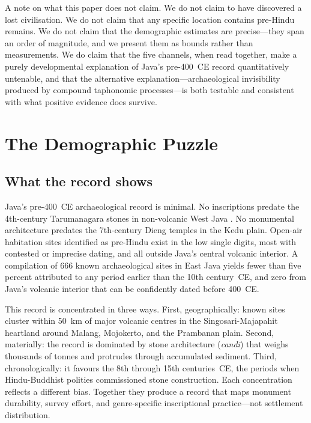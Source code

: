 \documentclass[12pt,a4paper]{article}
\begin{document}
A note on what this paper does not claim. We do not claim to have discovered a lost civilisation. We do not claim that any specific location contains pre-Hindu remains. We do not claim that the demographic estimates are precise---they span an order of magnitude, and we present them as bounds rather than measurements. We do claim that the five channels, when read together, make a purely developmental explanation of Java's pre-400~CE record quantitatively untenable, and that the alternative explanation---archaeological invisibility produced by compound taphonomic processes---is both testable and consistent with what positive evidence does survive.


\section{The Demographic Puzzle}
\label{sec:puzzle}

\subsection{What the record shows}

Java's pre-400~CE archaeological record is minimal. No inscriptions predate the 4th-century Tarumanagara stones in non-volcanic West Java \citep{vogel1918,coedes1968}. No monumental architecture predates the 7th-century Dieng temples in the Kedu plain. Open-air habitation sites identified as pre-Hindu exist in the low single digits, most with contested or imprecise dating, and all outside Java's central volcanic interior. A compilation of 666 known archaeological sites in East Java \citep[P1-core]{amien_p1core} yields fewer than five percent attributed to any period earlier than the 10th century~CE, and zero from Java's volcanic interior that can be confidently dated before 400~CE.

This record is concentrated in three ways. First, geographically: known sites cluster within 50~km of major volcanic centres in the Singosari-Majapahit heartland around Malang, Mojokerto, and the Prambanan plain. Second, materially: the record is dominated by stone architecture (\textit{candi}) that weighs thousands of tonnes and protrudes through accumulated sediment. Third, chronologically: it favours the 8th through 15th centuries~CE, the periods when Hindu-Buddhist polities commissioned stone construction. Each concentration reflects a different bias. Together they produce a record that maps monument durability, survey effort, and genre-specific inscriptional practice---not settlement distribution.
\end{document}
